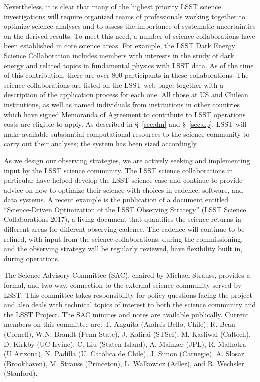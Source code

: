 Nevertheless, it is clear that many of the highest priority LSST science
investigations will require organized teams of professionals working together
to optimize science analyses and to assess the importance of systematic 
uncertainties on the derived results. To meet this need, a number of science
collaborations have been established in core science
areas. For example, the LSST Dark Energy Science Collaboration includes
members with interests in the study of dark energy and related topics in 
fundamental physics with LSST data. As of the time of this contribution, there are 
over 800 participants in these collaborations. %
The science collaborations are listed on the LSST web page, together
with a description of the application process for each one.  
All those at US and Chilean institutions,
as well as named individuals from institutions in other countries
which have signed Memoranda of Agreement to contribute to LSST
operations costs are eligible to apply. As described in
\S~\ref{sec:dm} and \S~\ref{sec:dp}, LSST will make available
substantial computational resources to the
science community to carry out their analyses; 
the system has been sized accordingly. 

As we design our observing strategies, we are actively seeking and implementing
input by the LSST science community.  The LSST science collaborations
in particular have helped develop the LSST science case and continue
to provide advice on how to optimize their science with choices in
cadence, software,  
and data systems. A recent example is the publication of a document
entitled ``Science-Driven Optimization of the LSST Observing
Strategy'' (LSST Science Collaborations 2017), a living document that
quantifies the science returns in different areas for different
observing cadence.  The cadence will continue to be refined, with
input from the science collaborations, during the commissioning, and
the observing strategy will be regularly reviewed, have flexibility
built in, during operations.  

The Science Advisory Committee (SAC), chaired by Michael Strauss,
provides a formal, and two-way, connection to the external science
community served by LSST. This committee takes responsibility for
policy questions facing the project and also deals with technical
topics of interest to both the science community and the LSST
Project. The SAC minutes and notes are available
publically. Current members on this committee are: T. Anguita (Andr\'es
Bello, Chile), R. Bean (Cornell), W.N. Brandt
(Penn State), J. Kalirai (STScI), M. Kasliwal
(Caltech), D. Kirkby (UC Irvine), C. Liu (Staten Island), A. Mainzer
(JPL), R. Malhotra (U Arizona),
N. Padilla (U. Cat\'olica de Chile), J. Simon (Carnegie), A. Slosar
(Brookhaven), M. Strauss (Princeton), L. Walkowicz (Adler),
and R. Wechsler (Stanford). 

